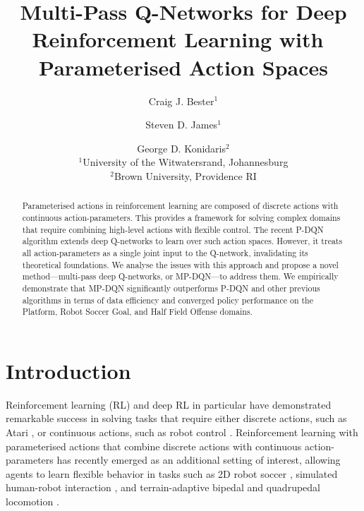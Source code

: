 \documentclass{article}
\title{Multi-Pass Q-Networks for Deep Reinforcement Learning with~\\Parameterised Action Spaces}
\author{
Craig J. Bester$^1$\and Steven D. James$^1$\and
George D. Konidaris$^2$\\
\affiliations
$^1$University of the Witwatersrand, Johannesburg\\
$^2$Brown University, Providence RI\\
}
\def\PDQN*{P\nobreakdash-DQN}
\def\MPDQN*{MP\nobreakdash-DQN}
\newcommand{\citep}{\cite}
\begin{document}
\maketitle

\begin{abstract}
Parameterised actions in reinforcement learning are composed of discrete actions with continuous action-parameters. This provides a framework for solving complex domains that require combining high-level actions with flexible control. The recent \PDQN* algorithm extends deep Q-networks to learn over such action spaces. However, it treats all action-parameters as a single joint input to the Q-network, invalidating its theoretical foundations. We analyse the issues with this approach and propose a novel method---multi-pass deep Q-networks, or \MPDQN*---to address them. We empirically demonstrate that \MPDQN* significantly outperforms \PDQN* and other previous algorithms in terms of data efficiency and converged policy performance on the Platform, Robot Soccer Goal, and Half Field Offense domains.
\end{abstract}


\section{Introduction}

Reinforcement learning (RL) and deep RL in particular have demonstrated remarkable success in solving tasks that require either discrete actions, such as Atari \citep{mnih2015}, or continuous actions, such as robot control \citep{schulman2015,lillicrap2015}. Reinforcement learning with parameterised actions \citep{masson2016} that combine discrete actions with continuous action-parameters has recently 
emerged as an additional setting of interest,  
allowing agents to learn flexible behavior in tasks such as 2D robot soccer
\citep{hausknecht2016,hussein2018}, simulated human-robot interaction \citep{khamassi2017}, and terrain-adaptive bipedal and quadrupedal locomotion \citep{peng2016}.
\end{document}
